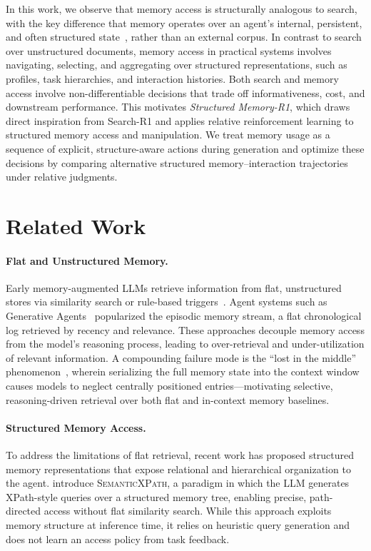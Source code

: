 \documentclass{article}
\theoremstyle{definition}
\begin{document}
In this work, we observe that memory access is structurally analogous to search, with the key difference that memory operates over an agent’s internal, persistent, and often structured state~\citep{park2023generative}, rather than an external corpus. In contrast to search over unstructured documents, memory access in practical systems involves navigating, selecting, and aggregating over structured representations, such as profiles, task hierarchies, and interaction histories. Both search and memory access involve non-differentiable decisions that trade off informativeness, cost, and downstream performance. This motivates \emph{Structured Memory-R1}, which draws direct inspiration from Search-R1 and applies relative reinforcement learning to structured memory access and manipulation. We treat memory usage as a sequence of explicit, structure-aware actions during generation and optimize these decisions by comparing alternative structured memory–interaction trajectories under relative judgments.\\

\section{Related Work}

\paragraph{Flat and Unstructured Memory.}
Early memory-augmented LLMs retrieve information from flat, unstructured stores via similarity search or rule-based triggers~\citep{lewis2020retrieval, khandelwal2020generalization}.
Agent systems such as Generative Agents~\citep{park2023generative} popularized the episodic memory stream, a flat chronological log retrieved by recency and relevance.
These approaches decouple memory access from the model's reasoning process, leading to over-retrieval and under-utilization of relevant information.
A compounding failure mode is the ``lost in the middle'' phenomenon~\citep{liu2024lost}, wherein serializing the full memory state into the context window causes models to neglect centrally positioned entries---motivating selective, reasoning-driven retrieval over both flat and in-context memory baselines.

\paragraph{Structured Memory Access.}
To address the limitations of flat retrieval, recent work has proposed structured memory representations that expose relational and hierarchical organization to the agent.
\citet{semanticxpath2026} introduce \textsc{SemanticXPath}, a paradigm in which the LLM generates XPath-style queries over a structured memory tree, enabling precise, path-directed access without flat similarity search.
While this approach exploits memory structure at inference time, it relies on heuristic query generation and does not learn an access policy from task feedback.
\end{document}
